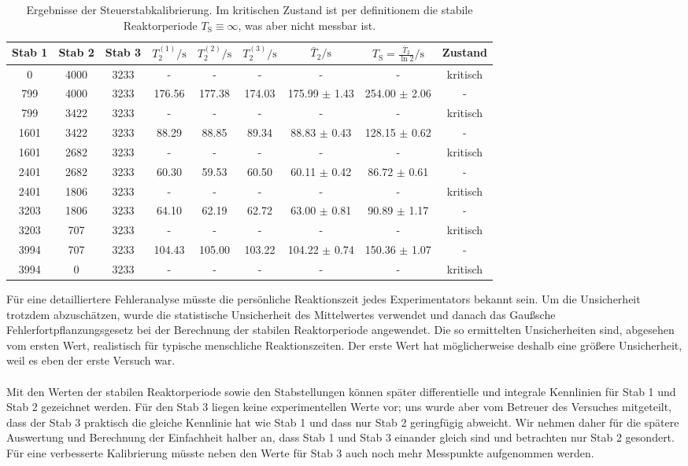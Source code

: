 \documentclass[german,  %
parskip=full,  %
]{scrartcl}
\begin{document}
\begin{table}[h!]\centering
\begin{tabular}{|c|c|c|c|c|c|c|c|c|}
\hline
Stab 1 & Stab 2 & Stab 3 & \({T}_2^{(1)}/\mathrm{s}\) & \({T}_2^{(2)}/\mathrm{s}\) & \({T}_2^{(3)}/\mathrm{s}\) & \(\bar{T}_2/\mathrm{s}\) & \(T_{\mathrm{S}} =\frac{\bar{T}_2}{\ln 2}/\mathrm{s}\) & Zustand \\\hline
0 & 4000 & 3233 & - & - & - & - & - & kritisch\\\hline
799 & 4000 & 3233 & 176.56 & 177.38 & 174.03 & 175.99 \(\pm\) 1.43 & 254.00 \(\pm\) 2.06 & -  \\\hline
799 & 3422 & 3233 & - & - & - & - & - & kritisch \\\hline
1601 & 3422 & 3233 & 88.29 & 88.85 & 89.34 & 88.83 \(\pm\) 0.43 & 128.15 \(\pm\) 0.62 & - \\\hline
1601 & 2682 & 3233 & - & - & - & - & - & kritisch \\\hline
2401 & 2682 & 3233 & 60.30 & 59.53 & 60.50 & 60.11 \(\pm\) 0.42 & 86.72 \(\pm\) 0.61 & - \\\hline
2401 & 1806 & 3233 & - & - & - & - & - & kritisch \\\hline
3203 & 1806 & 3233 & 64.10 & 62.19 & 62.72 & 63.00 \(\pm\) 0.81 & 90.89 \(\pm\) 1.17 & - \\\hline
3203 & 707 & 3233 & - & - & - & - & - & kritisch \\\hline
3994 & 707 & 3233 & 104.43 & 105.00 & 103.22 & 104.22 \(\pm\) 0.74 & 150.36 \(\pm\) 1.07 & - \\\hline
3994 & 0 & 3233 & - & - & - & - & - & kritisch \\\hline
\end{tabular}
\caption{Ergebnisse der Steuerstabkalibrierung. Im kritischen Zustand ist per definitionem die stabile Reaktorperiode \(T_{\mathrm{S}}\equiv\infty\), was aber nicht messbar ist.}
\end{table}
Für eine detailliertere Fehleranalyse müsste die persönliche Reaktionszeit jedes Experimentators bekannt sein. Um die Unsicherheit trotzdem abzuschätzen, wurde die statistische Unsicherheit des Mittelwertes verwendet und danach das Gaußsche Fehlerfortpflanzungsgesetz bei der Berechnung der stabilen Reaktorperiode angewendet. Die so ermittelten Unsicherheiten sind, abgesehen vom ersten Wert, realistisch für typische menschliche Reaktionszeiten. Der erste Wert hat möglicherweise deshalb eine größere Unsicherheit, weil es eben der erste Versuch war.  \\\\
Mit den Werten der stabilen Reaktorperiode sowie den Stabstellungen können später differentielle und integrale Kennlinien für Stab 1 und Stab 2 gezeichnet werden. Für den Stab 3 liegen keine experimentellen Werte vor; uns wurde aber vom Betreuer des Versuches mitgeteilt, dass der Stab 3 praktisch die gleiche Kennlinie hat wie Stab 1 und dass nur Stab 2 geringfügig abweicht. Wir nehmen daher für die spätere Auswertung und Berechnung der Einfachheit halber an, dass Stab 1 und Stab 3 einander gleich sind und betrachten nur Stab 2 gesondert. Für eine verbesserte Kalibrierung müsste neben den Werte für Stab 3 auch noch mehr Messpunkte aufgenommen werden.
\end{document}
